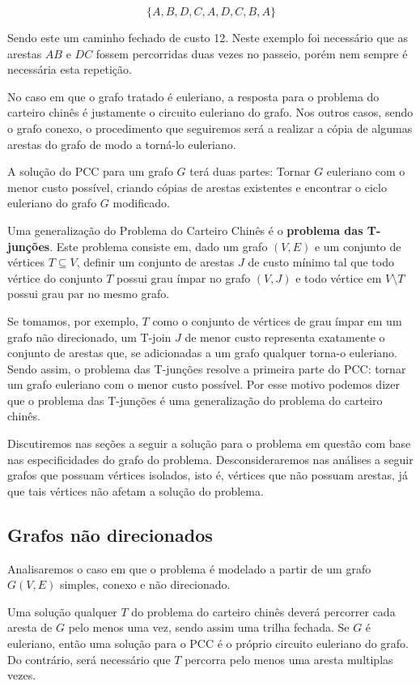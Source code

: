\[ \{A, B, D, C, A, D, C, B, A\} \] 

Sendo este um caminho fechado de custo 12.
Neste exemplo foi necessário que as arestas $AB$ e $DC$ fossem percorridas duas vezes no passeio, porém nem sempre é necessária esta repetição.

No caso em que o grafo tratado é euleriano, a resposta para o problema do carteiro chinês é justamente o circuito euleriano do grafo.
Nos outros casos, sendo o grafo conexo, o procedimento que seguiremos será a realizar a cópia de algumas arestas do grafo de modo a torná-lo euleriano.

A solução do PCC para um grafo $G$ terá duas partes: Tornar $G$ euleriano com o menor custo possível, criando cópias de arestas existentes e encontrar o ciclo euleriano do grafo $G$ modificado.

Uma generalização do Problema do Carteiro Chinês é o \textbf{problema das T-junções}.
Este problema consiste em, dado um grafo $(V, E)$ e um conjunto de vértices $T \subseteq V$, definir um conjunto de arestas $J$ de custo mínimo tal que todo vértice do conjunto $T$ possui grau ímpar no grafo $(V, J)$ e todo vértice em $V \setminus T$ possui grau par no mesmo grafo.

Se tomamos, por exemplo, $T$ como o conjunto de vértices de grau ímpar em um grafo não direcionado, um T-join $J$ de menor custo representa exatamente o conjunto de arestas que, se adicionadas a um grafo qualquer torna-o euleriano.
Sendo assim, o problema das T-junções resolve a primeira parte do PCC: tornar um grafo euleriano com o menor custo possível. 
Por esse motivo podemos dizer que o problema das T-junções é uma generalização do problema do carteiro chinês.

Discutiremos nas seções a seguir a solução para o problema em questão com base nas especificidades do grafo do problema. 
Desconsideraremos nas análises a seguir grafos que possuam vértices isolados, isto é, vértices que não possuam arestas, já que tais vértices não afetam a solução do problema.

\subsection{Grafos não direcionados}

Analisaremos o caso em que o problema é modelado a partir de um grafo $G(V, E)$ simples, conexo e não direcionado.

Uma solução qualquer $T$ do problema do carteiro chinês deverá percorrer cada aresta de $G$ pelo menos uma vez, sendo assim uma trilha fechada.
Se $G$ é euleriano, então uma solução para o PCC é o próprio circuito euleriano do grafo.
Do contrário, será necessário que $T$ percorra pelo menos uma aresta multiplas vezes.

